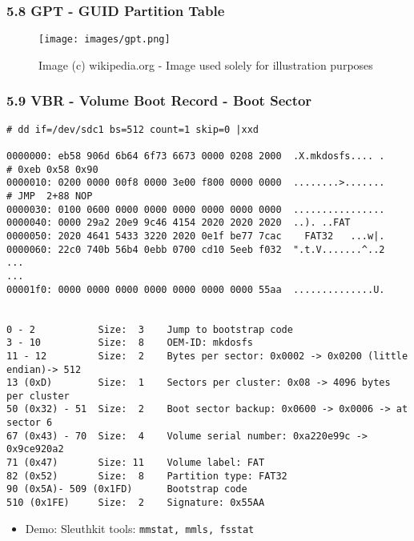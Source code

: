 \begin{frame}[fragile]
  \frametitle{5.8 GPT - GUID Partition Table}
    \begin{figure}
        \caption[]{\tiny Image (c) wikipedia.org - Image used solely for illustration purposes}
	    \texttt{[image: images/gpt.png]}
        \captionsetup{labelformat=empty,labelsep=none}
    \end{figure}
\end{frame}


\begin{frame}[fragile]
  \frametitle{5.9 VBR - Volume Boot Record - Boot Sector}
  \begin{lstlisting}[basicstyle=\tiny]
# dd if=/dev/sdc1 bs=512 count=1 skip=0 |xxd

0000000: eb58 906d 6b64 6f73 6673 0000 0208 2000  .X.mkdosfs.... .     # 0xeb 0x58 0x90
0000010: 0200 0000 00f8 0000 3e00 f800 0000 0000  ........>.......     # JMP  2+88 NOP
0000030: 0100 0600 0000 0000 0000 0000 0000 0000  ................
0000040: 0000 29a2 20e9 9c46 4154 2020 2020 2020  ..). ..FAT      
0000050: 2020 4641 5433 3220 2020 0e1f be77 7cac    FAT32   ...w|.
0000060: 22c0 740b 56b4 0ebb 0700 cd10 5eeb f032  ".t.V.......^..2
...
...
00001f0: 0000 0000 0000 0000 0000 0000 0000 55aa  ..............U.


0 - 2           Size:  3    Jump to bootstrap code
3 - 10          Size:  8    OEM-ID: mkdosfs
11 - 12         Size:  2    Bytes per sector: 0x0002 -> 0x0200 (little endian)-> 512
13 (0xD)        Size:  1    Sectors per cluster: 0x08 -> 4096 bytes per cluster
50 (0x32) - 51  Size:  2    Boot sector backup: 0x0600 -> 0x0006 -> at sector 6
67 (0x43) - 70  Size:  4    Volume serial number: 0xa220e99c -> 0x9ce920a2
71 (0x47)       Size: 11    Volume label: FAT
82 (0x52)       Size:  8    Partition type: FAT32
90 (0x5A)- 509 (0x1FD)	    Bootstrap code
510 (0x1FE)     Size:  2    Signature: 0x55AA
  \end{lstlisting}
    \begin{itemize}
        \item Demo: Sleuthkit tools: \texttt{mmstat, mmls, fsstat}
    \end{itemize}
\end{frame}




